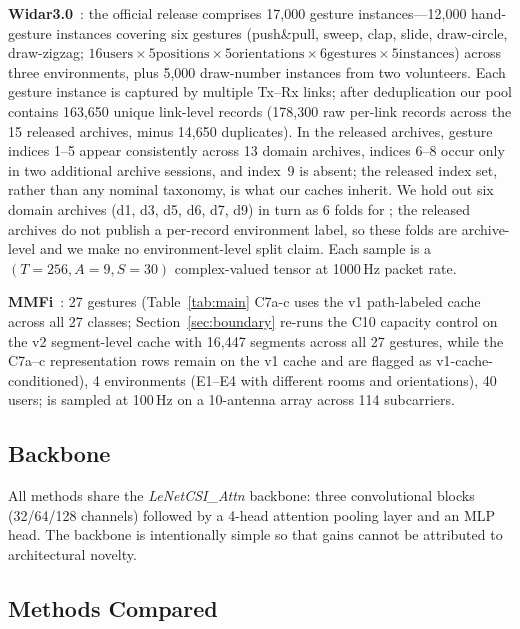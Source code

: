 \documentclass[11pt]{article}
\theoremstyle{definition}
\newcommand{\CSI}{\text{CSI}}
\newcommand{\LODO}{\text{LODO}}
\begin{document}
\textbf{Widar3.0}~\cite{zheng2019widar}: the official release comprises 17{,}000 gesture instances---12{,}000 hand-gesture instances covering six gestures (push\&pull, sweep, clap, slide, draw-circle, draw-zigzag; $16 \text{users} \times 5 \text{positions} \times 5 \text{orientations} \times 6 \text{gestures} \times 5 \text{instances}$) across three environments, plus 5{,}000 draw-number instances from two volunteers. Each gesture instance is captured by multiple Tx--Rx links; after deduplication our pool contains 163{,}650 unique link-level records (178{,}300 raw per-link records across the 15 released archives, minus 14{,}650 duplicates). In the released archives, gesture indices 1--5 appear consistently across 13 domain archives, indices 6--8 occur only in two additional archive sessions, and index~9 is absent; the released index set, rather than any nominal taxonomy, is what our caches inherit. We hold out six domain archives (d1, d3, d5, d6, d7, d9) in turn as 6 folds for \LODO; the released archives do not publish a per-record environment label, so these folds are archive-level and we make no environment-level split claim. Each sample is a $(T{=}256, A{=}9, S{=}30)$ complex-valued \CSI{} tensor at 1000\,Hz packet rate.

\textbf{MMFi}~\cite{yang2023mmfi}: 27 gestures (Table~\ref{tab:main} C7a-c uses the v1 path-labeled cache across all 27 classes; Section~\ref{sec:boundary} re-runs the C10 capacity control on the v2 segment-level cache with 16,447 segments across all 27 gestures, while the C7a--c representation rows remain on the v1 cache and are flagged as v1-cache-conditioned), 4 environments (E1--E4 with different rooms and orientations), 40 users; \CSI{} is sampled at 100\,Hz on a 10-antenna array across 114 subcarriers.

\subsection{Backbone}

All methods share the \textit{LeNetCSI\_Attn} backbone: three convolutional blocks (32/64/128 channels) followed by a 4-head attention pooling layer and an MLP head. The backbone is intentionally simple so that gains cannot be attributed to architectural novelty.

\subsection{Methods Compared}
\end{document}

